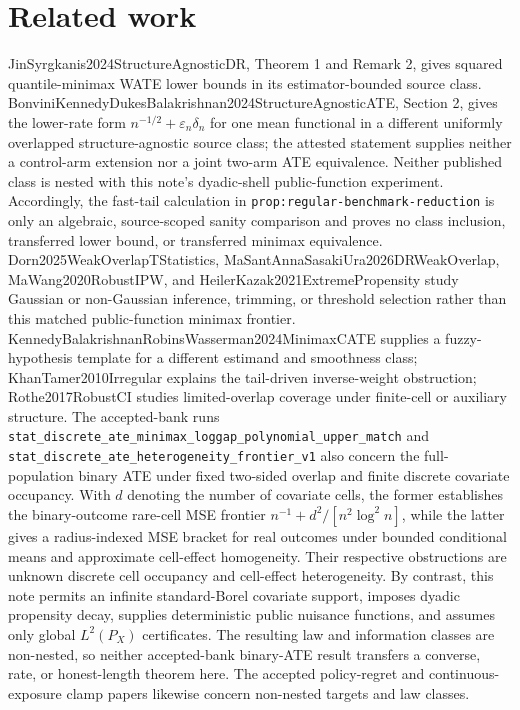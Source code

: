 \documentclass{article}
\begin{document}
\section{Related work}

JinSyrgkanis2024StructureAgnosticDR, Theorem 1 and Remark 2, gives squared quantile-minimax WATE lower bounds in its estimator-bounded source class. BonviniKennedyDukesBalakrishnan2024StructureAgnosticATE, Section 2, gives the lower-rate form \(n^{-1/2}+\varepsilon_n\delta_n\) for one mean functional in a different uniformly overlapped structure-agnostic source class; the attested statement supplies neither a control-arm extension nor a joint two-arm ATE equivalence. Neither published class is nested with this note's dyadic-shell public-function experiment. Accordingly, the fast-tail calculation in \texttt{prop:regular-benchmark-reduction} is only an algebraic, source-scoped sanity comparison and proves no class inclusion, transferred lower bound, or transferred minimax equivalence. Dorn2025WeakOverlapTStatistics, MaSantAnnaSasakiUra2026DRWeakOverlap, MaWang2020RobustIPW, and HeilerKazak2021ExtremePropensity study Gaussian or non-Gaussian inference, trimming, or threshold selection rather than this matched public-function minimax frontier. KennedyBalakrishnanRobinsWasserman2024MinimaxCATE supplies a fuzzy-hypothesis template for a different estimand and smoothness class; KhanTamer2010Irregular explains the tail-driven inverse-weight obstruction; Rothe2017RobustCI studies limited-overlap coverage under finite-cell or auxiliary structure. The accepted-bank runs \texttt{stat\_discrete\_ate\_minimax\_loggap\_polynomial\_upper\_match} and \texttt{stat\_discrete\_ate\_heterogeneity\_frontier\_v1} also concern the full-population binary ATE under fixed two-sided overlap and finite discrete covariate occupancy. With \(d\) denoting the number of covariate cells, the former establishes the binary-outcome rare-cell MSE frontier \(n^{-1}+d^2/[n^2\log^2 n]\), while the latter gives a radius-indexed MSE bracket for real outcomes under bounded conditional means and approximate cell-effect homogeneity. Their respective obstructions are unknown discrete cell occupancy and cell-effect heterogeneity. By contrast, this note permits an infinite standard-Borel covariate support, imposes dyadic propensity decay, supplies deterministic public nuisance functions, and assumes only global \(L^2(P_X)\) certificates. The resulting law and information classes are non-nested, so neither accepted-bank binary-ATE result transfers a converse, rate, or honest-length theorem here. The accepted policy-regret and continuous-exposure clamp papers likewise concern non-nested targets and law classes.
\end{document}

